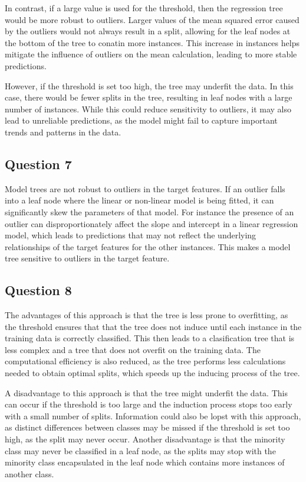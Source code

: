 \documentclass[10pt]{article}
\begin{document}
In contrast, if a large value is used for the threshold, then the regression tree would be more robust to outliers.
Larger values of the mean squared error caused by the outliers would not always result in a split, allowing for the
leaf nodes at the bottom of the tree to conatin more instances.
This increase in instances helps mitigate the influence of outliers on the mean calculation, leading to more stable predictions.

However, if the threshold is set too high, the tree may underfit the data. In this case, there would be fewer splits in
the tree, resulting in leaf nodes with a large number of instances. While this could reduce sensitivity to outliers, it may
also lead to unreliable predictions, as the model might fail to capture important trends and patterns in the data.

\subsection*{Question 7}

Model trees are not robust to outliers in the target features. If an outlier falls into a leaf node where the
linear or non-linear model is being fitted, it can significantly skew the parameters of that model. For instance
the presence of an outlier can disproportionately affect the slope and intercept in a linear regression model, which leads to
predictions that may not reflect the underlying relationships of the target features for the other instances. This makes a model
tree sensitive to outliers in the target feature.

\subsection*{Question 8}

The advantages of this approach is that the tree is less prone to overfitting, as the threshold
ensures that that the tree does not induce until each instance in the training data is correctly
classified. This then leads to a clasification tree that is less complex and a tree that does not
overfit on the training data. The computational efficiency is also reduced, as the tree performs
less calculations needed to obtain optimal splits, which speeds up the inducing process of the tree.

A disadvantage to this approach is that the tree might underfit the data. This can occur if the
threshold is too large and the induction process stops too early with a small number of splits.
Information could also be lopst with this approach, as distinct differences between classes may be missed
if the threshold is set too high, as the split may never occur. Another disadvantage is that the minority
class may never be classified in a leaf node, as the splits may stop with the minority class encapsulated in the leaf node
which contains more instances of another class.
\end{document}
